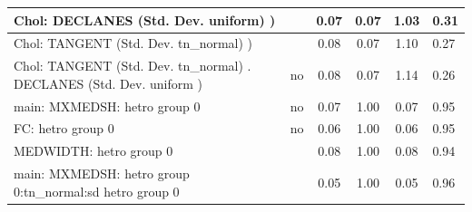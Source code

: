 \begin{table}
\begin{center}
\begin{tabular}{|l|l|c|c|c|l|}
			\hline
			 Chol: DECLANES (Std. Dev. uniform) ) &  & 0.07 & 0.07 & 1.03 & 0.31 \\
			\hline
			 Chol: TANGENT (Std. Dev. tn_normal) ) &  & 0.08 & 0.07 & 1.10 & 0.27 \\
			\hline
			 Chol: TANGENT (Std. Dev. tn_normal) . DECLANES (Std. Dev.   uniform ) & no & 0.08 & 0.07 & 1.14 & 0.26 \\
			\hline
			main: MXMEDSH: hetro group 0 & no & 0.07 & 1.00 & 0.07 & 0.95 \\
			\hline
			FC: hetro group 0 & no & 0.06 & 1.00 & 0.06 & 0.95 \\
			\hline
			MEDWIDTH: hetro group 0 &  & 0.08 & 1.00 & 0.08 & 0.94 \\
			\hline
			main: MXMEDSH: hetro group 0:tn_normal:sd  hetro group 0 &  & 0.05 & 1.00 & 0.05 & 0.96 \\
			\hline
		\end{tabular}
	\end{center}
\end{table}